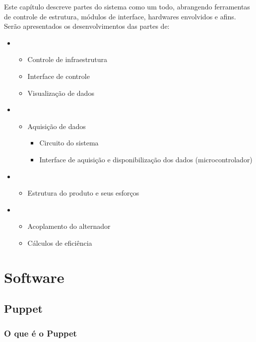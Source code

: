 Este capítulo descreve partes do sistema como um todo, abrangendo ferramentas de controle de estrutura, módulos de interface, hardwares envolvidos e afins. Serão apresentados os desenvolvimentos das partes de:

\begin{itemize}
	\item {}
	\begin{itemize}
		\item Controle de infraestrutura
		\item Interface de controle
		\item Visualização de dados
	\end{itemize}
	\item {}
	\begin{itemize}
		\item Aquisição de dados
		\begin{itemize}
			\item Circuito do sistema
			\item Interface de aquisição e disponibilização dos dados (microcontrolador)
		\end{itemize}
	\end{itemize}
	\item {}
	\begin{itemize}
		\item Estrutura do produto e seus esforços
	\end{itemize}
	\item {}
	\begin{itemize}
		\item Acoplamento do alternador
		\item Cálculos de eficiência
	\end{itemize}
\end{itemize}


\chapter{Software}
\label{software}

\section{Puppet} %
\label{sec:puppet}

\subsection{O que é o Puppet} %
\label{sub:o_que_o_puppet}

